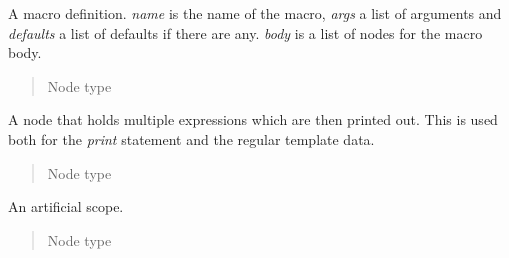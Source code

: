 \documentclass[a4paper,10pt,english]{sphinxmanual}
\begin{document}

\begin{fulllineitems}
\label{extensions:jinja2.nodes.Macro}
A macro definition.  \emph{name} is the name of the macro, \emph{args} a list of
arguments and \emph{defaults} a list of defaults if there are any.  \emph{body} is
a list of nodes for the macro body.
\begin{quote}\begin{description}
\item[{Node type}] \leavevmode
{\hyperref[extensions:jinja2.nodes.Stmt]{}}

\end{description}\end{quote}

\end{fulllineitems}


\begin{fulllineitems}
\label{extensions:jinja2.nodes.Output}
A node that holds multiple expressions which are then printed out.
This is used both for the \emph{print} statement and the regular template data.
\begin{quote}\begin{description}
\item[{Node type}] \leavevmode
{\hyperref[extensions:jinja2.nodes.Stmt]{}}

\end{description}\end{quote}

\end{fulllineitems}


\begin{fulllineitems}
\label{extensions:jinja2.nodes.Scope}
An artificial scope.
\begin{quote}\begin{description}
\item[{Node type}] \leavevmode
{\hyperref[extensions:jinja2.nodes.Stmt]{}}

\end{description}\end{quote}

\end{fulllineitems}
\end{document}
